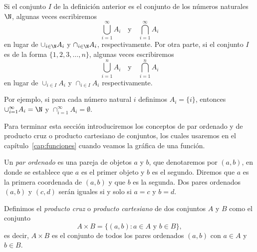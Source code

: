 \documentclass[12pt,a4paper]{book}
\begin{document}
    Si el conjunto $I$ de la definición anterior es el conjunto de los números
    naturales $\N$, algunas veces escribiremos
    \begin{equation*}
        \bigcup_{i=1}^{\infty}A_{i}\quad\text{y}\quad\bigcap_{i=1}^{\infty}A_{i}
    \end{equation*}
    en lugar de $\cup_{i\in\N}A_{i}$ y $\cap_{i\in\N}A_{i}$, respectivamente. Por otra parte, si el conjunto
    $I$ es de la forma $\{1,2,3,\ldots,n\}$, algunas veces escribiremos
    \begin{equation*}
        \bigcup_{i=1}^{n}A_{i}\quad\text{y}\quad\bigcap_{i=1}^{n}A_{i}
    \end{equation*}
    en lugar de $\cup_{i\in I}A_{i}$ y $\cap_{i\in I}A_{i}$ respectivamente.

    Por ejemplo, si para cada número natural $i$ definimos $A_{i}=\{i\}$, entonces
    $\cup_{i=1}^{\infty}A_{i}=\N$ y $\cap_{i=1}^{\infty}A_{i}=\emptyset$.

    Para terminar esta sección introduciremos los conceptos de par ordenado
    y de producto cruz o producto cartesiano de conjuntos, los cuales usaremos
    en el capítulo~\ref{cap:funciones} cuando veamos la gráfica de una función.

    \begin{definicion}\label{def:6}\label{def:par-ordenado}
        Un \textit{par ordenado} es una pareja de objetos
        $a$ y $b$, que denotaremos por $(a,b)$, en donde se establece que $a$ es el primer
        objeto y $b$ es el segundo. Diremos que $a$ es la primera coordenada de $(a,b)$ y
        que $b$ es la segunda. Dos pares ordenados $(a,b)$ y $(c,d)$ serán iguales si y solo
        si $a=c$ y $b=d$.
    \end{definicion}

    \begin{definicion}\label{def:7}
        Definimos el \textit{producto cruz}
        o \textit{producto cartesiano} de dos conjuntos $A$ y $B$ como el conjunto
        \begin{equation*}
            A\times B=\{(a,b):a\in A\text{ y }b\in B\},
        \end{equation*}
        es decir, $A\times B$ es el conjunto de todos los pares ordenados $(a,b)$ con $a\in A$
        y $b\in B$.
    \end{definicion}
\end{document}
